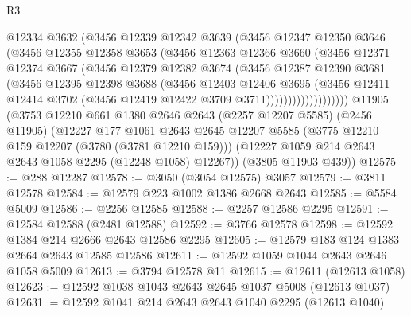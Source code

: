 \begin{lexlean}{R3}
\begin{coremodule}
                    @12334
                    @3632
                    (@3456
                      @12339
                      @12342
                      @3639
                      (@3456
                        @12347
                        @12350
                        @3646
                        (@3456
                          @12355
                          @12358
                          @3653
                          (@3456
                            @12363
                            @12366
                            @3660
                            (@3456
                              @12371
                              @12374
                              @3667
                              (@3456
                                @12379
                                @12382
                                @3674
                                (@3456
                                  @12387
                                  @12390
                                  @3681
                                  (@3456
                                    @12395
                                    @12398
                                    @3688
                                    (@3456
                                      @12403
                                      @12406
                                      @3695
                                      (@3456
                                        @12411
                                        @12414
                                        @3702
                                        (@3456 @12419 @12422 @3709 @3711)))))))))))))))))))
    @11905
    (@3753
      @12210
      @661
      @1380
      @2646
      @2643
      (@2257 @12207 @5585)
      (@2456 @11905)
      (@12227
        @177
        @1061
        @2643
        @2645
        @12207
        @5585
        (@3775 @12210 @159 @12207 (@3780 (@3781 @12210 @159)))
        (@12227 @1059 @214 @2643 @2643 @1058 @2295 (@12248 @1058) @12267))
      (@3805 @11903 @439))
@12575 := @288 @12287
@12578 := @3050 (@3054 @12575) @3057
@12579 := @3811 @12578
@12584 := @12579 @223 @1002 @1386 @2668 @2643
@12585 := @5584 @5009
@12586 := @2256 @12585
@12588 := @2257 @12586 @2295
@12591 := @12584 @12588 (@2481 @12588)
@12592 := @3766 @12578
@12598 := @12592 @1384 @214 @2666 @2643 @12586 @2295
@12605 := @12579 @183 @124 @1383 @2664 @2643 @12585 @12586
@12611 := @12592 @1059 @1044 @2643 @2646 @1058 @5009
@12613 := @3794 @12578 @11
@12615 := @12611 (@12613 @1058)
@12623 := @12592 @1038 @1043 @2643 @2645 @1037 @5008 (@12613 @1037)
@12631 := @12592 @1041 @214 @2643 @2643 @1040 @2295 (@12613 @1040)

\end{coremodule}
\end{lexlean}
